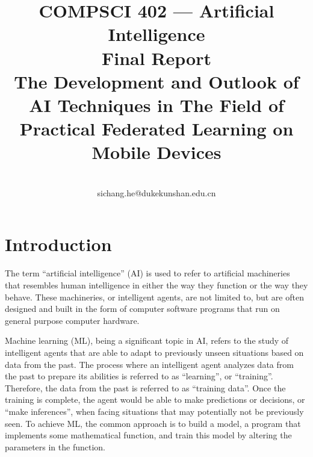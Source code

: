 \documentclass[conference]{IEEEtran}
\begin{document}
\title{
    COMPSCI 402 --- Artificial Intelligence\\
    Final Report\\
    The Development and Outlook of AI Techniques in The Field of
    Practical Federated Learning on Mobile Devices
}

\author{
    \\
    sichang.he@dukekunshan.edu.cn
}

\maketitle

\begin{abstract}
\end{abstract}

\section{Introduction}


The term ``artificial intelligence'' (AI) is used to refer to
artificial machineries that
resembles human intelligence in either the way they function or
the way they behave.
These machineries, or intelligent agents,
are not limited to,
but are often designed and built in the form of computer software programs that
run on general purpose computer hardware.

Machine learning (ML), being a significant topic in AI,
refers to the study of intelligent agents that are able to
adapt to previously unseen situations based on data from the past.
The process where an intelligent agent analyzes data from the past to
prepare its abilities is referred to as ``learning'', or ``training''.
Therefore, the data from the past is referred to as ``training data''.
Once the training is complete,
the agent would be able to make predictions or decisions,
or ``make inferences'',
when facing situations that may potentially not be previously seen.
To achieve ML, the common approach is to build a model,
a program that implements some mathematical function,
and train this model by altering the parameters in the function.

\end{document}
